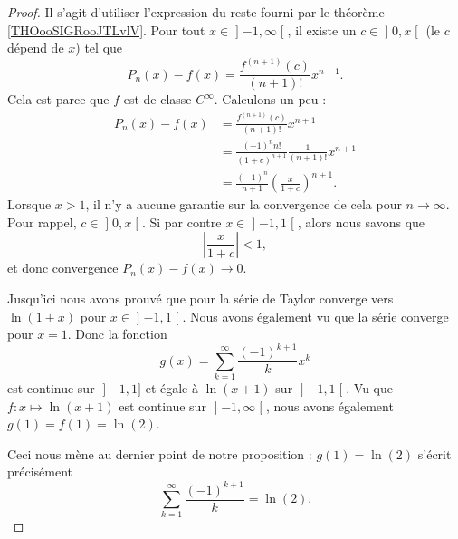 \begin{proof}
	Il s'agit d'utiliser l'expression du reste fourni par le théorème \ref{THOooSIGRooJTLvlV}. Pour tout \( x\in \mathopen] -1 , \infty \mathclose[\), il existe un \( c\in\mathopen] 0 , x \mathclose[\) (le \( c\) dépend de \( x\)) tel que
		\begin{equation}
			P_n(x)-f(x)=\frac{ f^{(n+1)}(c) }{ (n+1)! }x^{n+1}.
		\end{equation}
		Cela est parce que \( f\) est de classe \(  C^{\infty}\). Calculons un peu :
		\begin{subequations}
			\begin{align}
				P_n(x)-f(x) & =\frac{ f^{(n+1)}(c) }{ (n+1)! }x^{n+1}                        \\
				            & =\frac{ (-1)^nn! }{ (1+c)^{n+1} }\frac{1}{ (n+1)! }x^{n+1}     \\
				            & =\frac{ (-1)^n }{ n+1 }\left( \frac{ x }{ 1+c } \right)^{n+1}.
			\end{align}
		\end{subequations}
		Lorsque \( x>1\), il n'y a aucune garantie sur la convergence de cela pour \( n\to \infty\). Pour rappel, \( c\in\mathopen] 0 , x \mathclose[\). Si par contre \( x\in\mathopen] -1 , 1 \mathclose[\), alors nous savons que
		\begin{equation}
			\left| \frac{ x }{ 1+c } \right| <1,
		\end{equation}
		et donc convergence \( P_n(x)-f(x)\to 0\).

		Jusqu'ici nous avons prouvé que pour la série de Taylor converge vers \( \ln(1+x)\) pour \( x\in \mathopen] -1 , 1 \mathclose[\). Nous avons également vu que la série converge pour \( x=1\). Donc la fonction
		\begin{equation}
			g(x)=\sum_{k=1}^{\infty}\frac{ (-1)^{k+1} }{ k }x^k
		\end{equation}
		est continue sur \( \mathopen] -1 , 1 \mathclose]\) et égale à \( \ln(x+1)\) sur \( \mathopen] -1 , 1 \mathclose[\). Vu que \( f\colon x\mapsto \ln(x+1)\) est continue sur \( \mathopen] -1 , \infty \mathclose[\), nous avons également \( g(1)=f(1)=\ln(2)\).

	Ceci nous mène au dernier point de notre proposition : \( g(1)=\ln(2)\) s'écrit précisément
	\begin{equation}
		\sum_{k=1}^{\infty}\frac{ (-1)^{k+1} }{ k }=\ln(2).
	\end{equation}
\end{proof}

